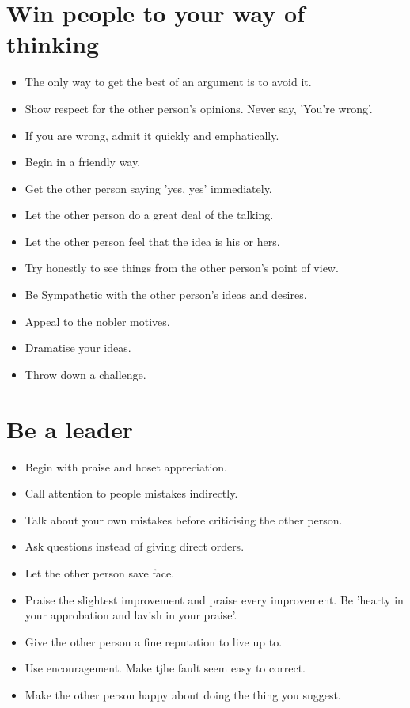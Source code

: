 \documentclass[10pt,portrait]{article}
\begin{document}
    \section*{Win people to your way of thinking}
    \begin{itemize}
      \item The only way to get the best of an argument is to avoid it.
      \item Show respect for the other person's opinions. Never say, 'You're wrong'. 
      \item If you are wrong, admit it quickly and emphatically.
      \item Begin in a friendly way.
      \item Get the other person saying 'yes, yes' immediately.
      \item Let the other person do a great deal of the talking.
      \item Let the other person feel that the idea is his or hers.
      \item Try honestly to see things from the other person's point of view.
      \item Be Sympathetic with the other person's ideas and desires.
      \item Appeal to the nobler motives.
      \item Dramatise your ideas.
      \item Throw down a challenge.
    \end{itemize}
    
    \section*{Be a leader}
    \begin{itemize}
      \item Begin with praise and hoset appreciation.
      \item Call attention to people mistakes indirectly.
      \item Talk about your own mistakes before criticising the other person.
      \item Ask questions instead of giving direct orders.
      \item Let the other person save face.
      \item Praise the slightest improvement and praise every improvement. Be 'hearty in your approbation and lavish in your praise'.
      \item Give the other person a fine reputation to live up to.
      \item Use encouragement. Make tjhe fault seem easy to correct.
      \item Make the other person happy about doing the thing you suggest.
    \end{itemize}
\end{document}
